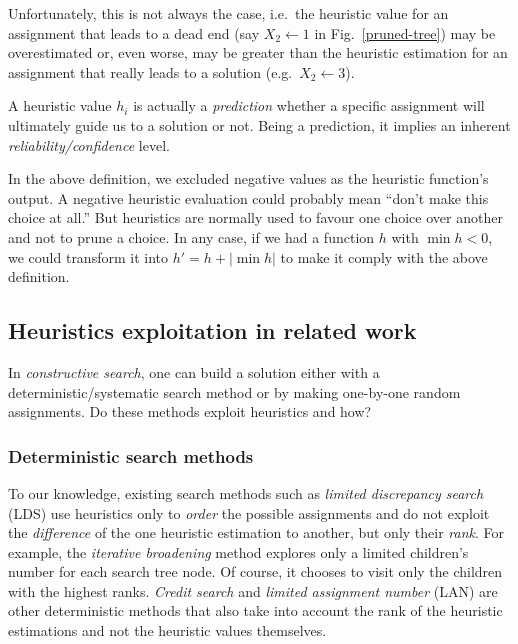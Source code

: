 \documentclass{ws-ijait}
\begin{document}
Unfortunately, this is not always the case, i.e.\ the
heuristic value for an assignment that leads to a dead end
(say $X_2 \gets 1$ in Fig.~\ref{pruned-tree}) may be
overestimated or, even worse, may be greater than the
heuristic estimation for an assignment that really leads to
a solution (e.g.\ $X_2 \gets 3$).

A heuristic value $h_i$ is actually a \emph{prediction}
whether a specific assignment will ultimately guide us to a
solution or not. Being a prediction, it implies an inherent
\emph{reliability\slash confidence} level.

In the above definition, we excluded negative values as the
heuristic function's output. A negative heuristic evaluation
could probably mean ``don't make this choice at all.'' But
heuristics are normally used to favour one choice over
another and not to prune a choice. In any case, if we had a
function $h$ with $\min h < 0$, we could transform it into
$h' = h + |\min h|$ to make it comply with the above
definition.

\subsection{Heuristics exploitation in related work}

In \emph{constructive search}, one can build a solution
either with a deterministic\slash systematic search method
or by making one-by-one random assignments. Do these methods
exploit heuristics and how?

\subsubsection{Deterministic search
               methods\label{deterministic}}

To our knowledge, existing search methods such as
\emph{limited discrepancy search} (LDS) use heuristics only
to \emph{order} the possible assignments and do not exploit
the \emph{difference} of the one heuristic estimation to
another, but only their \emph{rank}.\cite{Prosser2011} For
example, the \emph{iterative broadening} method explores
only a limited children's number for each search tree
node.\cite{Ginsberg1992} Of course, it chooses to visit only
the children with the highest ranks. \emph{Credit
search}\cite{Bartak2004} and \emph{limited assignment
number} (LAN)\cite{Bartak2005} are other deterministic
methods that also take into account the rank of the
heuristic estimations and not the heuristic values
themselves.
\end{document}
